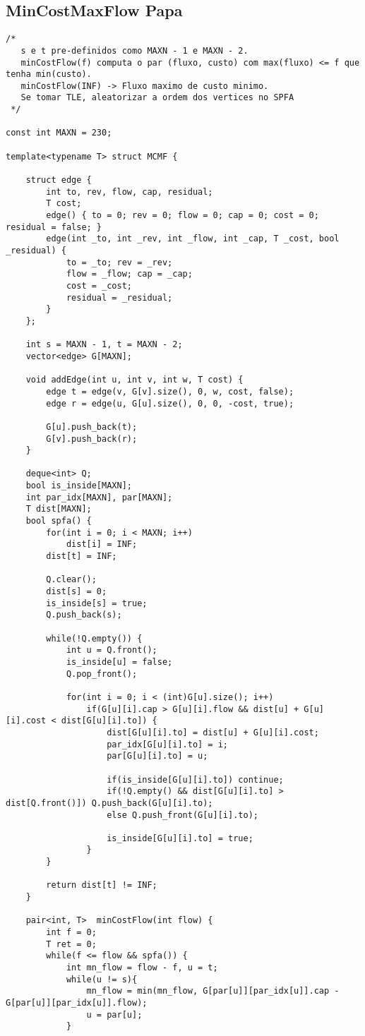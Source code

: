 \documentclass[12pt, a4paper, twoside]{article}
\begin{document}
\subsection{MinCostMaxFlow Papa}
\begin{lstlisting}
/*
   s e t pre-definidos como MAXN - 1 e MAXN - 2.
   minCostFlow(f) computa o par (fluxo, custo) com max(fluxo) <= f que tenha min(custo).
   minCostFlow(INF) -> Fluxo maximo de custo minimo.
   Se tomar TLE, aleatorizar a ordem dos vertices no SPFA
 */

const int MAXN = 230;

template<typename T> struct MCMF {
	
	struct edge {
		int to, rev, flow, cap, residual;
		T cost;
		edge() { to = 0; rev = 0; flow = 0; cap = 0; cost = 0; residual = false; }
		edge(int _to, int _rev, int _flow, int _cap, T _cost, bool _residual) {
			to = _to; rev = _rev;
			flow = _flow; cap = _cap;
			cost = _cost;
			residual = _residual;
		}
	};

	int s = MAXN - 1, t = MAXN - 2;
	vector<edge> G[MAXN];

	void addEdge(int u, int v, int w, T cost) {
		edge t = edge(v, G[v].size(), 0, w, cost, false);
		edge r = edge(u, G[u].size(), 0, 0, -cost, true);

		G[u].push_back(t);
		G[v].push_back(r);
	}

	deque<int> Q;
	bool is_inside[MAXN];
	int par_idx[MAXN], par[MAXN];
	T dist[MAXN];
	bool spfa() {
		for(int i = 0; i < MAXN; i++)
			dist[i] = INF;
		dist[t] = INF;

		Q.clear();
		dist[s] = 0;
		is_inside[s] = true;
		Q.push_back(s);

		while(!Q.empty()) {
			int u = Q.front();
			is_inside[u] = false;
			Q.pop_front();

			for(int i = 0; i < (int)G[u].size(); i++)
				if(G[u][i].cap > G[u][i].flow && dist[u] + G[u][i].cost < dist[G[u][i].to]) {
					dist[G[u][i].to] = dist[u] + G[u][i].cost;
					par_idx[G[u][i].to] = i;
					par[G[u][i].to] = u;

					if(is_inside[G[u][i].to]) continue;
					if(!Q.empty() && dist[G[u][i].to] > dist[Q.front()]) Q.push_back(G[u][i].to);
					else Q.push_front(G[u][i].to);

					is_inside[G[u][i].to] = true;
				}
		}

		return dist[t] != INF;
	}

	pair<int, T>  minCostFlow(int flow) {
		int f = 0;
		T ret = 0;
		while(f <= flow && spfa()) {
			int mn_flow = flow - f, u = t;
			while(u != s){
				mn_flow = min(mn_flow, G[par[u]][par_idx[u]].cap - G[par[u]][par_idx[u]].flow);
				u = par[u];
			}


\end{lstlisting}
\end{document}
